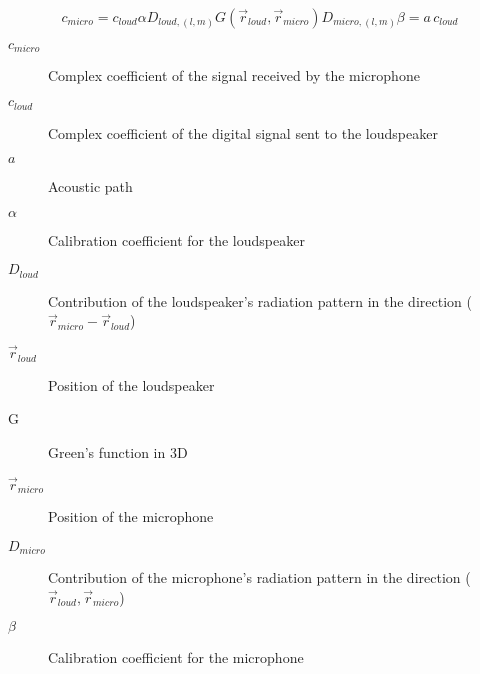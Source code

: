 %

\begin{equation}
c_\mathit{micro} = c_\mathit{loud} \alpha D_{loud, (l,m)} G(\vec{r}_{loud}, \vec{r}_{micro}) D_{micro, (l,m)} \beta = a \, c_\mathit{loud}
\label{transEquationCalibration}
\end{equation}

\begin{description}
	\item[$c_\mathit{micro}$] Complex coefficient of the signal received by the microphone
	\item[$c_\mathit{loud}$] Complex coefficient of the digital signal sent to the loudspeaker
	\item[$a$] Acoustic path
	\item[$\alpha$] Calibration coefficient for the loudspeaker
	\item[$D_{loud}$] Contribution of the loudspeaker's radiation pattern in the direction ($\vec{r}_{micro} - \vec{r}_{loud}$)
	\item[$\vec{r}_{loud}$] Position of the loudspeaker
	\item[G] Green's function in 3D
	\item[$\vec{r}_{micro}$] Position of the microphone
	\item[$D_{micro}$] Contribution of the microphone's radiation pattern in the direction ($\vec{r}_{loud}, \vec{r}_{\mathit{micro}}$)
	\item[$\beta$] Calibration coefficient for the microphone
\end{description}

